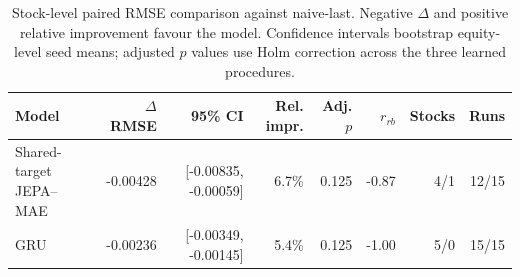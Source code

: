 \begin{table}[t]
\centering
\small
\caption{Stock-level paired RMSE comparison against naive-last. Negative $\Delta$ and positive relative improvement favour the model. Confidence intervals bootstrap equity-level seed means; adjusted $p$ values use Holm correction across the three learned procedures.}
\label{tab:paired_rmse_naive}
\begin{tabular}{lrrrrrrr}
\toprule
Model & $\Delta$RMSE & 95\% CI & Rel. impr. & Adj. $p$ & $r_{rb}$ & Stocks & Runs \\
\midrule
Shared-target JEPA--MAE & -0.00428 & [-0.00835, -0.00059] & 6.7\% & 0.125 & -0.87 & 4/1 & 12/15 \\
GRU & -0.00236 & [-0.00349, -0.00145] & 5.4\% & 0.125 & -1.00 & 5/0 & 15/15 \\
\bottomrule
\end{tabular}
\end{table}
